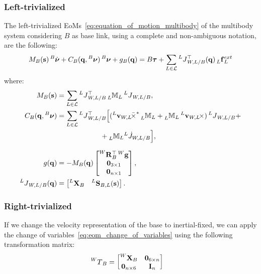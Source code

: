 \subsubsection{Left-trivialized}

The left-trivialized \acp{EoM}~\eqref{eq:equation_of_motion_multibody} of the multibody system considering $B$ as base link, using a complete and non-ambiguous notation, are the following:
%
\begin{equation*}
    M_B(\Shape) \Nud[B] + C_B(\Qu, \Nu[B]) \Nu[B] + g_B(\Qu) = B \Torques + \sum_{L \in \mathcal{L}} \jac[L]_{W,L/B}^\top(\Qu) \forcesix[L]_L^{ext} 
\end{equation*}
%
where:
%
\begin{align*}
    M_B(\Shape) &= \sum_{L\in\mathcal{L}} \jac[L]_{W,L/B}^\top \masssix[L]_L \jac[L]_{W,L/B} ,\\
    C_B(\Qu, \Nu[B]) &= \sum_{L\in\mathcal{L}} \jac[L]_{W,L/B}^\top \Big[ (\crossforsix[{\velsix[L]_{W,L}}] \masssix[L]_L + \masssix[L]_L \crossvelsix[{\velsix[L]_{W,L}}]) \jac[L]_{W,L/B} + \\
    &\phantom{\sum_{L\in\mathcal{L}} \jac[L]_{W,L/B}^\top \Big[} + \masssix[L]_L {}^L\dot{J}_{W,L/B} \Big] ,\\
    g(\Qu) &= -M_B(\Qu) \begin{bmatrix}\rot[W]_B^\top \gravity[W] \\ \zeros_{3\times1} \\ \zeros_{n\times1}\end{bmatrix} ,\\
    \jac[L]_{W,L/B}(\Qu) &= 
    \begin{bmatrix}
        \transvel[L]_B & \subspacee[L]_{B,L}(\Shape)
    \end{bmatrix}
    .
\end{align*}

\subsubsection{Right-trivialized}

If we change the velocity representation of the base to inertial-fixed, we can apply the change of variables~\eqref{eq:eom_change_of_variables} using the following transformation matrix:
%
\begin{align*}
    \transrepr[W]_B &=
    \begin{bmatrix}
        \transvel[W]_B & \zeros_{6\times n} \\
        \zeros_{n\times6} & \eye_n
    \end{bmatrix}
\end{align*}

